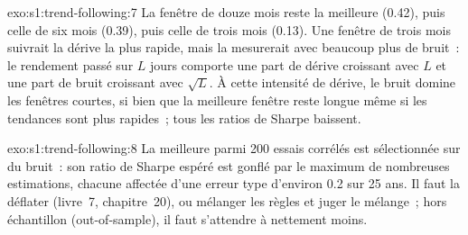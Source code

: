 \begin{solution}{exo:s1:trend-following:7}
La fenêtre de douze mois reste la meilleure (0.42), puis celle de six mois (0.39), puis celle de trois mois (0.13). Une fenêtre de trois mois suivrait la dérive la plus rapide, mais la mesurerait avec
beaucoup plus de bruit~: le rendement passé sur $L$ jours comporte une part de dérive croissant avec $L$ et une part de bruit croissant avec $\sqrt{L}$. À cette intensité de dérive, le
bruit domine les fenêtres courtes, si bien que la meilleure fenêtre reste longue même si les tendances sont plus rapides~; tous les ratios de Sharpe baissent.
\end{solution}

\begin{solution}{exo:s1:trend-following:8}
La meilleure parmi 200 essais corrélés est sélectionnée sur du bruit~: son ratio de Sharpe espéré est gonflé par le maximum de nombreuses estimations, chacune affectée d'une erreur
type d'environ 0.2 sur 25 ans. Il faut la déflater (livre~7, chapitre~20), ou mélanger les règles et juger le mélange~; hors échantillon (out-of-sample), il faut s'attendre à nettement moins.
\end{solution}

